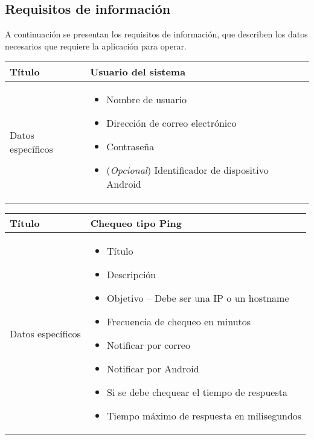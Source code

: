\FloatBarrier
\subsection{Requisitos de información}
\label{sec:requisitos-informacion}

A continuación se presentan los requisitos de información, que describen los
datos necesarios que requiere la aplicación para operar.

\begin{center}
  
  \begin{tabularx}{\textwidth}{|l|X|}
    \hline

    Título & Usuario del sistema\\

    \hline
    Datos específicos &

    \begin{itemize}
    \item Nombre de usuario
    \item Dirección de correo electrónico
    \item Contraseña
    \item (\textit{Opcional}) Identificador de dispositivo Android
    \end{itemize}
    \\
    
    \hline
    
  \end{tabularx}
\end{center}


\begin{center}
  
  \begin{tabularx}{\textwidth}{|l|X|}
    \hline

    Título & Chequeo tipo Ping \\

    \hline
    Datos específicos &

    \begin{itemize}
      \item Título 
      \item Descripción
      \item Objetivo -- Debe ser una IP o un hostname
      \item Frecuencia de chequeo en minutos
      \item Notificar por correo
      \item Notificar por Android
      \item Si se debe chequear el tiempo de respuesta
      \item Tiempo máximo de respuesta en milisegundos
    \end{itemize}
    \\
    
    \hline
    
  \end{tabularx}
\end{center}

